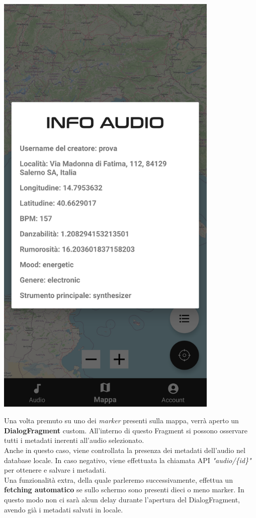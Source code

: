 \documentclass{article}
\begin{document}
\begin{minipage}[t]{0.35\textwidth}
    \centering
    \vspace*{20pt}
    \includegraphics[width=0.8\textwidth]{audiodatadialog.png}
\end{minipage}
\hfill
\begin{minipage}[t]{0.6\textwidth}
    \raggedright
    \vspace*{30pt}
    Una volta premuto su uno dei \textit{marker} presenti sulla mappa, verrà aperto un \textbf{DialogFragment} custom. All'interno di questo Fragment si possono osservare tutti i metadati inerenti all'audio selezionato.\\
    Anche in questo caso, viene controllata la presenza dei metadati dell'audio nel database locale. In caso negativo, viene effettuata la chiamata API \textit{"audio/\{id\}"} per ottenere e salvare i metadati.\vspace*{14pt}\\
    Una funzionalità extra, della quale parleremo successivamente, effettua un \textbf{fetching automatico} se sullo schermo sono presenti dieci o meno marker. In questo modo non ci sarà alcun delay durante l'apertura del DialogFragment, avendo già i metadati salvati in locale.
\end{minipage}
\end{document}
